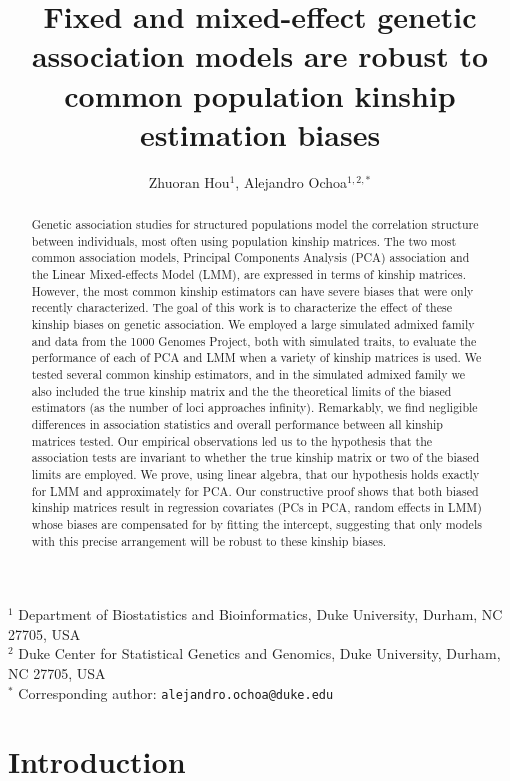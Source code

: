 \documentclass[11pt]{article}
\title{\Large \textbf{Fixed and mixed-effect genetic association models are robust to common population kinship estimation biases}}
\author{Zhuoran Hou$^1$, Alejandro Ochoa$^{1,2,*}$}
\date{}
\begin{document}
\maketitle

\noindent
$^1$ Department of Biostatistics and Bioinformatics, Duke University, Durham, NC 27705, USA \\
$^2$ Duke Center for Statistical Genetics and Genomics, Duke University, Durham, NC 27705, USA \\
$^*$ Corresponding author: \texttt{alejandro.ochoa@duke.edu}


\begin{abstract}
  Genetic association studies for structured populations model the correlation structure between individuals, most often using population kinship matrices.
  The two most common association models, Principal Components Analysis (PCA) association and the Linear Mixed-effects Model (LMM), are expressed in terms of kinship matrices.
  However, the most common kinship estimators can have severe biases that were only recently characterized.
  The goal of this work is to characterize the effect of these kinship biases on genetic association.
  We employed a large simulated admixed family and data from the 1000 Genomes Project, both with simulated traits, to evaluate the performance of each of PCA and LMM when a variety of kinship matrices is used.
  We tested several common kinship estimators, and in the simulated admixed family we also included the true kinship matrix and the the theoretical limits of the biased estimators (as the number of loci approaches infinity).
  Remarkably, we find negligible differences in association statistics and overall performance between all kinship matrices tested.
  Our empirical observations led us to the hypothesis that the association tests are invariant to whether the true kinship matrix or two of the biased limits are employed.
  We prove, using linear algebra, that our hypothesis holds exactly for LMM and approximately for PCA.
  Our constructive proof shows that both biased kinship matrices result in regression covariates (PCs in PCA, random effects in LMM) whose biases are compensated for by fitting the intercept, suggesting that only models with this precise arrangement will be robust to these kinship biases.
\end{abstract}

\clearpage

\section{Introduction}
\end{document}
